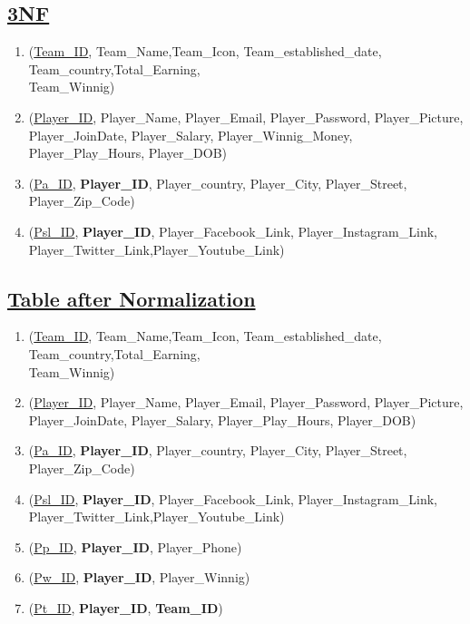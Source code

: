 \subsection*{\underline{3NF}}
\begin{enumerate}
    \item (\underline{Team\_ID}, Team\_Name,Team\_Icon, Team\_established\_date, Team\_country,Total\_Earning,\\Team\_Winnig)
    \item (\underline{Player\_ID}, Player\_Name, Player\_Email, Player\_Password, Player\_Picture, Player\_JoinDate, Player\_Salary, Player\_Winnig\_Money, Player\_Play\_Hours, Player\_DOB)
    \item  (\underline{Pa\_ID}, \textbf{Player\_ID}, Player\_country, Player\_City, Player\_Street, Player\_Zip\_Code)
    \item  (\underline{Psl\_ID}, \textbf{Player\_ID}, Player\_Facebook\_Link, Player\_Instagram\_Link, Player\_Twitter\_Link,Player\_Youtube\_Link)

\end{enumerate}

\clearpage
\subsection*{\underline{Table after Normalization}}
\begin{enumerate}
    \item (\underline{Team\_ID}, Team\_Name,Team\_Icon, Team\_established\_date, Team\_country,Total\_Earning,\\Team\_Winnig)
    \item (\underline{Player\_ID}, Player\_Name, Player\_Email, Player\_Password, Player\_Picture, Player\_JoinDate, Player\_Salary, Player\_Play\_Hours, Player\_DOB)
    \item  (\underline{Pa\_ID}, \textbf{Player\_ID}, Player\_country, Player\_City, Player\_Street, Player\_Zip\_Code)
    \item  (\underline{Psl\_ID}, \textbf{Player\_ID}, Player\_Facebook\_Link, Player\_Instagram\_Link, Player\_Twitter\_Link,Player\_Youtube\_Link)
    \item  (\underline{Pp\_ID}, \textbf{Player\_ID}, Player\_Phone)
    \item  (\underline{Pw\_ID}, \textbf{Player\_ID}, Player\_Winnig)
    \item  (\underline{Pt\_ID}, \textbf{Player\_ID}, \textbf{Team\_ID})
\end{enumerate}


\clearpage

